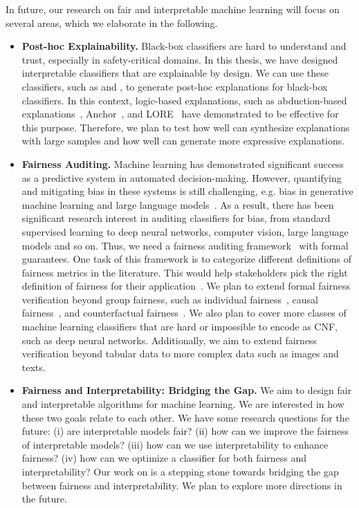 In future, our research on fair and interpretable machine learning will focus on several areas, which we elaborate in the following.

\begin{itemize}
	\item 
	\textbf{Post-hoc Explainability.} Black-box classifiers are hard to understand and trust, especially in safety-critical domains. In this thesis, we have designed interpretable classifiers that are explainable by design. We can use these classifiers, such as {\imli} and {\crr}, to generate post-hoc explanations for black-box classifiers. In this context, logic-based explanations, such as abduction-based explanations~\cite{ignatiev2019abduction}, Anchor~\cite{ribeiro2018anchors}, and LORE~\cite{guidotti2018local} have demonstrated to be effective for this purpose. Therefore, we plan to test how well {\imli} can synthesize explanations with large samples and how well {\crr} can generate more expressive explanations.
	
	
	\item \textbf{Fairness Auditing.} Machine learning has demonstrated significant success as a predictive system in automated decision-making. However, quantifying and mitigating bias in these systems is still challenging, e.g. bias in generative machine learning and large language models~\cite{abid2021persistent,nadeem2020stereoset,vig2020investigating}. As a result, there has been significant research interest in auditing classifiers for bias, from standard supervised learning to deep neural networks, computer vision, large language models and so on. Thus, we need a fairness auditing framework~\cite{ruf2021towards,yan2022active} with formal guarantees. One task of this framework is to categorize different definitions of fairness metrics in the literature. This would help stakeholders pick the right definition of fairness for their application~\cite{ruf2021towards}. We plan to extend formal fairness verification beyond group fairness, such as individual fairness~\cite{john2020verifying}, causal fairness~\cite{pan2021explaining,zhang2018fairness}, and counterfactual fairness~\cite{wu2019counterfactual,chiappa2019path}. We also plan to cover more classes of machine learning classifiers that are hard or impossible to encode as CNF, such as deep neural networks. Additionally, we aim to extend fairness verification beyond tabular data to more complex data such as images and texts.
	
	
	\item \textbf{Fairness and Interpretability: Bridging the Gap.} We aim to design fair and interpretable algorithms for  machine learning. We are interested in how these two goals relate to each other. We have some research questions for the future: (i) are interpretable models fair? (ii) how can we improve the fairness of interpretable models? (iii) how can we use interpretability to enhance fairness? (iv) how can we optimize a classifier for both fairness and interpretability? Our work on {\fairXplainer} is a stepping stone towards bridging the gap between fairness and interpretability. We plan to explore more directions in the future.
	

\end{itemize}
